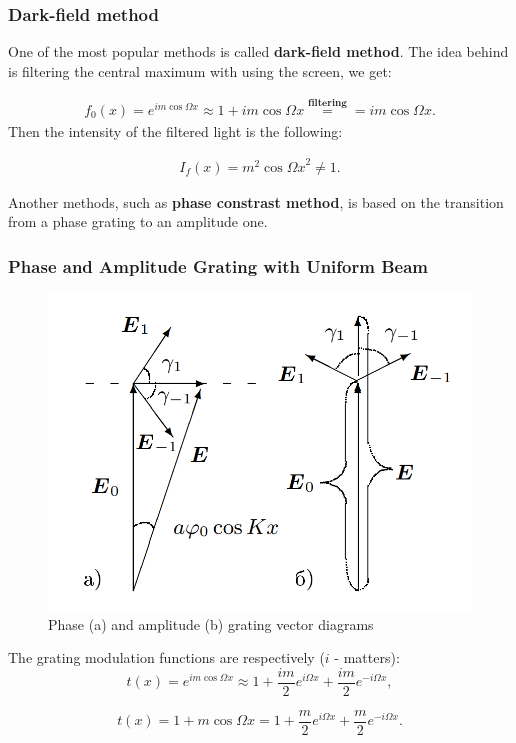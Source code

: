 \documentclass{beamer}
\begin{document}
	\begin{frame}
		\frametitle{Dark-field method}
		
		One of the most popular methods is called \textbf{dark-field method}. The idea behind is filtering the central maximum with using the screen, we get:
		
		\begin{equation*}
			\begin{split}
				f_0(x) = e^{i m \cos{\Omega x}} \approx 1 +  i m \cos{\Omega x} \overset{\textbf{filtering}}{=} =  i m \cos{\Omega x}.
			\end{split}
		\end{equation*}
		Then the intensity of the filtered light is the following:
		
		\begin{equation*}
			\begin{split}
				I_f(x) = m^2 \cos{\Omega x}^2 \neq 1.
			\end{split}
		\end{equation*}
	
		Another methods, such as \textbf{phase constrast method}, is based on the transition from a phase grating to an amplitude one.
	\end{frame}

	\begin{frame}
		\frametitle{Phase and Amplitude Grating with Uniform Beam}
		
		\begin{figure}
			\centering
			\includegraphics[width=0.5\linewidth]{res/amplitude_phase_grating}
			\caption{Phase (a) and amplitude (b) grating vector diagrams}
			\label{fig:amplitudephasegrating}
		\end{figure}
		
		The grating modulation functions are respectively ($i$ - matters):
		$$	t(x) = e^{i m \cos \Omega x} \approx 1 + \frac{im}{2}e^{i \Omega x} + \frac{im}{2}e^{-i \Omega x},$$
		
		$$	t(x) = 1 + m \cos{\Omega x} = 1 + \frac{m}{2}e^{i \Omega x} + \frac{m}{2}e^{-i \Omega x}. $$
	
	\end{frame}	
\end{document}
